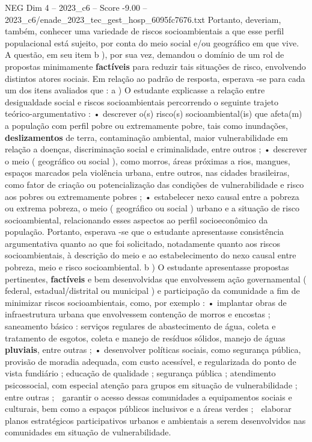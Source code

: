 \begin{textsample}{NEG Dim 4 – 2023\_c6 – Score -9.00 – 2023\_c6/enade\_2023\_tec\_gest\_hosp\_6095fc7676.txt}
Portanto, deveriam, também, conhecer uma variedade de riscos socioambientais a que esse perfil populacional está sujeito, por conta do meio social e/ou geográfico em que vive.
A questão, em seu item b ), por sua vez, demandou o domínio de um rol de propostas minimamente \textbf{factíveis} para reduzir tais situações de risco, envolvendo distintos atores sociais.
Em relação ao padrão de resposta, esperava -se para cada um dos itens avaliados que : a ) O estudante explicasse a relação entre desigualdade social e riscos socioambientais percorrendo o seguinte trajeto teórico-argumentativo : • descrever o(s) risco(s) socioambiental(is) que afeta(m) a população com perfil pobre ou extremamente pobre, tais como inundações, \textbf{deslizamentos} de terra, contaminação ambiental, maior vulnerabilidade em relação a doenças, discriminação social e criminalidade, entre outros ; • descrever o meio ( geográfico ou social ), como morros, áreas próximas a rios, mangues, espaços marcados pela violência urbana, entre outros, nas cidades brasileiras, como fator de criação ou potencialização das condições de vulnerabilidade e risco aos pobres ou extremamente pobres ; • estabelecer nexo causal entre a pobreza ou extrema pobreza, o meio ( geográfico ou social ) urbano e a situação de risco socioambiental, relacionando esses aspectos ao perfil socioeconômico da população.
Portanto, esperava -se que o estudante apresentasse consistência argumentativa quanto ao que foi solicitado, notadamente quanto aos riscos socioambientais, à descrição do meio e ao estabelecimento do nexo causal entre pobreza, meio e risco socioambiental. b ) O estudante apresentasse propostas pertinentes, \textbf{factíveis} e bem desenvolvidas que envolvessem ação governamental ( federal, estadual/distrital ou municipal ) e participação da comunidade a fim de minimizar riscos socioambientais, como, por exemplo : • implantar obras de infraestrutura urbana que envolvessem contenção de morros e encostas ; saneamento básico : serviços regulares de abastecimento de água, coleta e tratamento de esgotos, coleta e manejo de resíduos sólidos, manejo de águas \textbf{pluviais}, entre outras ; • desenvolver políticas sociais, como segurança pública, provisão de moradia adequada, com custo acessível, e regularizada do ponto de vista fundiário ; educação de qualidade ; segurança pública ; atendimento psicossocial, com especial atenção para grupos em situação de vulnerabilidade ; entre outras ;  garantir o acesso dessas comunidades a equipamentos sociais e culturais, bem como a espaços públicos inclusivos e a áreas verdes ;  elaborar planos estratégicos participativos urbanos e ambientais a serem desenvolvidos nas comunidades em situação de vulnerabilidade.

\end{textsample}
